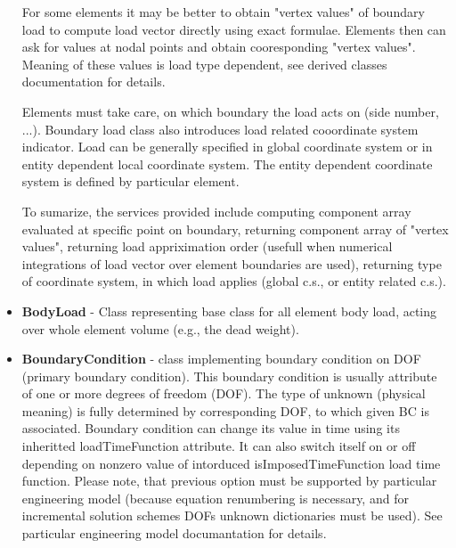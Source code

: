 \documentclass[a4paper]{article}
\newcommand{\class}[1]{{\bf #1}}
\newcommand{\attribute}[1]{#1}
\begin{document}
\begin{itemize}
For some elements it may be better to obtain "vertex values" of
boundary load to compute load vector directly using exact
formulae. Elements then can ask for values at nodal points and obtain
cooresponding "vertex values". Meaning of these values is load type
dependent, see derived classes documentation for details.


Elements must take care, on which boundary the load acts on (side
number, ...). Boundary load class also introduces load related
cooordinate system indicator. Load can be generally specified in
global coordinate system or in entity dependent local coordinate
system. The entity dependent coordinate system is defined by
particular element. 

To sumarize, the services provided include computing component array
evaluated at specific point on boundary, returning component array of
"vertex values", returning load appriximation order (usefull
when numerical integrations of load vector over element boundaries are
used), returning type of coordinate system, in which load
applies (global c.s., or entity related c.s.).

\item
\class{BodyLoad} - Class representing base class for all element body load, acting over
whole element volume (e.g., the dead weight). 

\item
\class{BoundaryCondition} - class implementing boundary condition on DOF (primary boundary condition). 
This boundary condition is usually attribute of one or more degrees of
freedom (DOF). The type of unknown (physical meaning) is fully
determined by corresponding DOF, to which given BC is associated. 
Boundary condition can change its value in time using its inheritted
\attribute{loadTimeFunction} attribute.
It can also switch itself on or off depending on nonzero value of intorduced
isImposedTimeFunction load time function. Please note, that previous option must be
supported by particular engineering model (because equation renumbering is necessary,
and for incremental solution schemes DOFs unknown dictionaries must be used). See particular
engineering model documantation for details.


\end{itemize}
\end{document}
